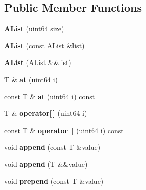 \subsection*{Public Member Functions}
\begin{DoxyCompactItemize}
\item 
\mbox{\label{class_a_list_ab1d008b3fd27e2925f4b386ac2a40ebb}} 
{\bfseries A\+List} (uint64 size)
\item 
\mbox{\label{class_a_list_a6009559ea4861f2a9263e447485dfeb2}} 
{\bfseries A\+List} (const \mbox{\hyperlink{class_a_list}{A\+List}} \&list)
\item 
\mbox{\label{class_a_list_a0e4ad9eb6d7cbb883a56f67589c65be9}} 
{\bfseries A\+List} (\mbox{\hyperlink{class_a_list}{A\+List}} \&\&list)
\item 
\mbox{\label{class_a_list_a3d5b7d06f274500c8b6fd3023b901b8b}} 
T \& {\bfseries at} (uint64 i)
\item 
\mbox{\label{class_a_list_a9ad261a0e55e749c88921de518b1a6d1}} 
const T \& {\bfseries at} (uint64 i) const
\item 
\mbox{\label{class_a_list_a85d2ad05e1b20339f6dfc64bcd37026f}} 
T \& {\bfseries operator\mbox{[}$\,$\mbox{]}} (uint64 i)
\item 
\mbox{\label{class_a_list_a6bbd9c13506077c05b29f32a7fd0a4cf}} 
const T \& {\bfseries operator\mbox{[}$\,$\mbox{]}} (uint64 i) const
\item 
\mbox{\label{class_a_list_a210e9e0657a0f4541247a290d21b6d23}} 
void {\bfseries append} (const T \&value)
\item 
\mbox{\label{class_a_list_ac8e33a3962d74310ebafc8d99be5437a}} 
void {\bfseries append} (T \&\&value)
\item 
\mbox{\label{class_a_list_a35838eb653492086769df4c444e08281}} 
void {\bfseries prepend} (const T \&value)
\item 
\mbox{\label{class_a_list_a6cae264346546d9e6cc68252a2e0b3d5}} 

\end{DoxyCompactItemize}
